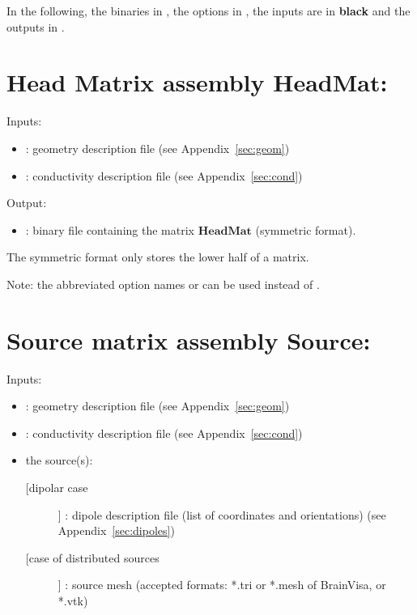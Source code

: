 \noindent
In the following, the binaries in , the options in , the inputs are in  \textbf{black} and the outputs in  . 

\section{Head Matrix assembly $\mathbf{HeadMat}$:}
\label{sect: command assemble HeadMat}

\noindent
Inputs: 
\begin{itemize}
    \item {}: geometry description file (see Appendix~\ref{sec:geom})
    \item {}: conductivity description file (see Appendix~\ref{sec:cond})
\end{itemize}

\noindent
Output:
\begin{itemize}
    \item {}: binary file containing the matrix $\mathbf{HeadMat}$ (symmetric format).
\end{itemize}
The symmetric format only stores the lower half of a matrix.
\medskip

\noindent
{}
\medskip
Note: the abbreviated option names  or  can be used instead of .

\section{Source matrix assembly $\mathbf{Source}$:}
\label{sect: command assemble SourceMat}

\noindent
Inputs: 
\begin{itemize}
    \item {}: geometry description file (see Appendix~\ref{sec:geom})
    \item {}: conductivity description file (see Appendix~\ref{sec:cond})
    \item the source(s):
        \begin{description}
            \item [[dipolar case]] : dipole description file (list of coordinates and orientations)
                                    (see Appendix~\ref{sec:dipoles}) 
            \item [[case of distributed sources]]  : source mesh (accepted formats:  *.tri or *.mesh of BrainVisa, or *.vtk) 
        \end{description}
\end{itemize}


